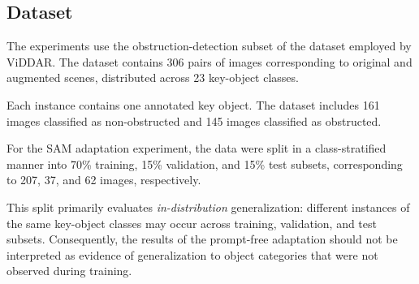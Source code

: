 \documentclass[conference]{IEEEtran}
\begin{document}




\subsection{Dataset}

The experiments use the obstruction-detection subset of the dataset employed by ViDDAR. The dataset contains 306 pairs of images corresponding to original and augmented scenes, distributed across 23 key-object classes.

Each instance contains one annotated key object. The dataset includes 161 images classified as non-obstructed and 145 images classified as obstructed.

For the SAM adaptation experiment, the data were split in a class-stratified manner into 70\% training, 15\% validation, and 15\% test subsets, corresponding to 207, 37, and 62 images, respectively.

This split primarily evaluates \textit{in-distribution} generalization: different instances of the same key-object classes may occur across training, validation, and test subsets. Consequently, the results of the prompt-free adaptation should not be interpreted as evidence of generalization to object categories that were not observed during training.
\end{document}
